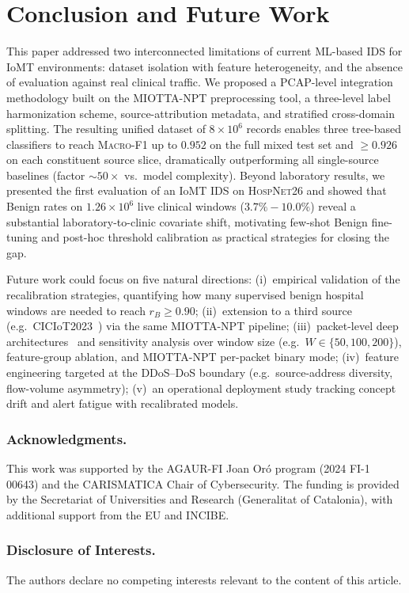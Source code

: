 \documentclass[runningheads]{llncs}
\newcommand{\macroF}{\textsc{Macro-F1}}
\begin{document}
\section{Conclusion and Future Work}
\label{sec:conclusion}

This paper addressed two interconnected limitations of current ML-based IDS for IoMT environments: dataset isolation with feature heterogeneity, and the absence of evaluation against real clinical traffic. We proposed a PCAP-level integration methodology built on the MIOTTA-NPT preprocessing tool, a three-level label harmonization scheme, source-attribution metadata, and stratified cross-domain splitting. The resulting unified dataset of $8 \times 10^{6}$ records enables three tree-based classifiers to reach \macroF{} up to $0.952$ on the full mixed test set and $\geq 0.926$ on each constituent source slice, dramatically outperforming all single-source baselines (factor $\sim 50\times$ vs.\ model complexity). Beyond laboratory results, we presented the first evaluation of an IoMT IDS on \textsc{HospNet26} and showed that Benign rates on $1.26\!\times\!10^{6}$ live clinical windows ($3.7\%\!-\!10.0\%$) reveal a substantial laboratory-to-clinic covariate shift, motivating few-shot Benign fine-tuning and post-hoc threshold calibration as practical strategies for closing the gap. 

Future work could focus on five natural directions:
(i)~empirical validation of the recalibration strategies, quantifying how many supervised benign hospital windows are needed to reach $r_{B} \geq 0.90$;
(ii)~extension to a third source (e.g.\ CICIoT2023~\cite{neto2023ciciot2023}) via the same MIOTTA-NPT pipeline;
(iii)~packet-level deep architectures~\cite{holland2021nprint} and sensitivity analysis over window size (e.g.\ $W \in \{50,100,200\}$), feature-group ablation, and MIOTTA-NPT per-packet binary mode;
(iv)~feature engineering targeted at the DDoS--DoS boundary (e.g.\ source-address diversity, flow-volume asymmetry);
(v)~an operational deployment study tracking concept drift and alert fatigue with recalibrated models.

\subsubsection*{Acknowledgments.}
This work was supported by the AGAUR-FI Joan Oró program (2024 FI-1 00643) and the CARISMATICA Chair of Cybersecurity. The funding is provided by the Secretariat of Universities and Research (Generalitat of Catalonia), with additional support from the EU and INCIBE.

\subsubsection*{Disclosure of Interests.}
The authors declare no competing interests relevant to the content of this article.

{\small
\vspace{-2mm}
\let\oldthebibliography\thebibliography
\renewcommand{\thebibliography}[1]{\oldthebibliography{#1}\setlength{\itemsep}{-0.5pt plus 0.1ex}\setlength{\parskip}{0pt}}


}
\end{document}
